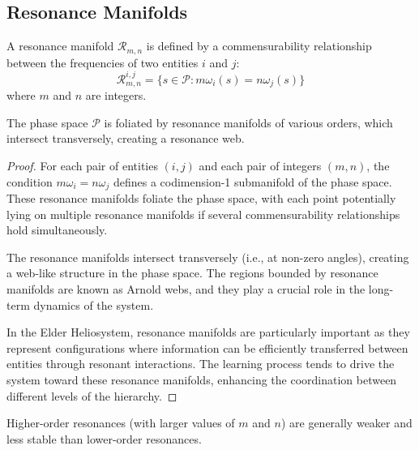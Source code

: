 \subsection{Resonance Manifolds}

\begin{definition}
A resonance manifold $\mathcal{R}_{m,n}$ is defined by a commensurability relationship between the frequencies of two entities $i$ and $j$:
\begin{equation}
\mathcal{R}_{m,n}^{i,j} = \{s \in \mathcal{P} : m\omega_i(s) = n\omega_j(s)\}
\end{equation}
where $m$ and $n$ are integers.
\end{definition}

\begin{theorem}
The phase space $\mathcal{P}$ is foliated by resonance manifolds of various orders, which intersect transversely, creating a resonance web.
\end{theorem}

\begin{proof}
For each pair of entities $(i,j)$ and each pair of integers $(m,n)$, the condition $m\omega_i = n\omega_j$ defines a codimension-1 submanifold of the phase space. These resonance manifolds foliate the phase space, with each point potentially lying on multiple resonance manifolds if several commensurability relationships hold simultaneously.

The resonance manifolds intersect transversely (i.e., at non-zero angles), creating a web-like structure in the phase space. The regions bounded by resonance manifolds are known as Arnold webs, and they play a crucial role in the long-term dynamics of the system.

In the Elder Heliosystem, resonance manifolds are particularly important as they represent configurations where information can be efficiently transferred between entities through resonant interactions. The learning process tends to drive the system toward these resonance manifolds, enhancing the coordination between different levels of the hierarchy.
\end{proof}

\begin{theorem}
Higher-order resonances (with larger values of $m$ and $n$) are generally weaker and less stable than lower-order resonances.
\end{theorem}

